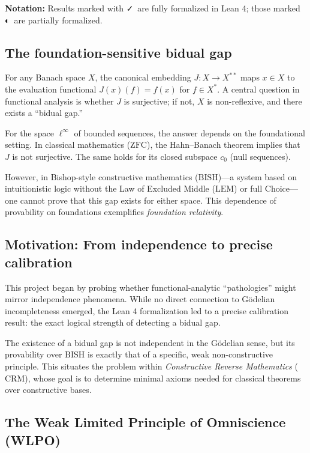 \documentclass[11pt]{article}  %
\newcommand{\leanok}{\textsf{\small \textcolor{green!70!black}{✓}}}
\newcommand{\leanpartial}{\textsf{\small \textcolor{orange!80!black}{◐}}}
\newcommand{\linf}{\ell^\infty}
\newcommand{\BISH}{\mathrm{BISH}}
\newcommand{\CRM}{\mathrm{CRM}}
\newcommand{\LEM}{\mathrm{LEM}}
\newcommand{\ZFC}{\mathrm{ZFC}}
\begin{document}
\noindent\textbf{Notation:} Results marked with \leanok\ are fully formalized in Lean 4; those marked \leanpartial\ are partially formalized.

\subsection{The foundation-sensitive bidual gap}

For any Banach space $X$, the canonical embedding $J:X\to X^{**}$ maps $x\in X$ to the evaluation functional $J(x)(f)=f(x)$ for $f\in X^*$. A central question in functional analysis is whether $J$ is surjective; if not, $X$ is non-reflexive, and there exists a ``bidual gap.''

For the space $\linf$ of bounded sequences, the answer depends on the foundational setting. In classical mathematics ($\ZFC$), the Hahn--Banach theorem implies that $J$ is not surjective. The same holds for its closed subspace $c_0$ (null sequences).

However, in Bishop-style constructive mathematics ($\BISH$)---a system based on intuitionistic logic without the Law of Excluded Middle ($\LEM$) or full Choice---one cannot prove that this gap exists for either space. This dependence of provability on foundations exemplifies \emph{foundation relativity}.

\subsection{Motivation: From independence to precise calibration}

This project began by probing whether functional-analytic ``pathologies'' might mirror independence phenomena. While no direct connection to G\"odelian incompleteness emerged, the Lean 4 formalization led to a precise calibration result: the exact logical strength of detecting a bidual gap.

The existence of a bidual gap is not independent in the G\"odelian sense, but its provability over $\BISH$ is exactly that of a specific, weak non-constructive principle. This situates the problem within \emph{Constructive Reverse Mathematics} ($\CRM$), whose goal is to determine minimal axioms needed for classical theorems over constructive bases.

\subsection{The Weak Limited Principle of Omniscience (WLPO)}
\end{document}
